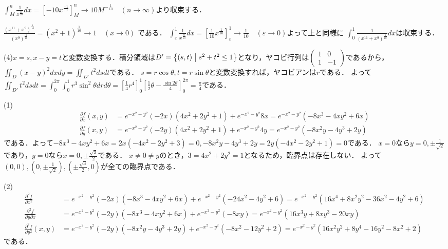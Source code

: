 \documentclass[
		book,
		head_space=20mm,
		foot_space=20mm,
		gutter=10mm,
		line_length=190mm
]{jlreq}
\begin{document}
$\int_M^n \frac{1}{x^{\frac{11}{10}}}dx=\left[ -10x^{\frac{-1}{10}} \right]_M^n\rightarrow 10 M^{-\frac{1}{10}}\quad(n\to \infty)$より収束する．

$\frac{(x^{11}+x^9)^{\frac{1}{10}}}{(x^{9})^{\frac{1}{10}}}=(x^2+1)^{\frac{1}{10}}\rightarrow 1\quad(x\to 0)$
である．
$\int_\varepsilon^1 \frac{1}{x^{\frac{9}{10}}}dx=\left[ \frac{1}{10}x^{\frac{1}{10}} \right]_\varepsilon^1\rightarrow \frac{1}{10}\quad(\varepsilon\rightarrow 0)$よって上と同様に
$\int_0^1 \frac{1}{(x^{11}+x^9)^{\frac{1}{10}}}dx$は収束する．

(4)$x=s,x-y=t$と変数変換する．積分領域は$D'=\left\{ (s,t)\mathrel{}\middle|\mathrel{} s^2+t^2\le 1\right\}$となり，ヤコビ行列は$\begin{pmatrix}
1&0\\1&-1
\end{pmatrix}$であるから，
$\iint_D (x-y)^2dxdy=\iint_{D'} t^2dsdt$である．
$s=r\cos \theta,t=r\sin \theta$と変数変換すれば，ヤコビアンは$r$である．
よって$\iint_{D'}t^2dsdt=\int_0^{2\pi}\int_0^1 r^3\sin^2 \theta dr d\theta=[\frac{1}{4}r^4]_0^1[\frac{1}{2}\theta-\frac{\sin 2\theta}{4}]_0^{2\pi}=\frac{\pi}{4}$である．

(1)\begin{align}
	\frac{\partial f}{\partial x}(x,y)&=e^{-x^2-y^2}(-2x)(4x^2+2y^2+1)+e^{-x^2-y^2}8x=e^{-x^2-y^2}(-8x^3-4xy^2+6x)\\
	\frac{\partial f}{\partial y}(x,y)&=e^{-x^2-y^2}(-2y)(4x^2+2y^2+1)+e^{-x^2-y^2}4y=e^{-x^2-y^2}(-8x^2y-4y^3+2y)
\end{align}
である．よって$-8x^3-4xy^2+6x=2x(-4x^2-2y^2+3)=0,-8x^2y-4y^3+2y=2y(-4x^2-2y^2+1)=0$である．
$x=0$なら$y=0,\pm\frac{1}{\sqrt{2}}$であり，$y=0$なら$x=0,\pm\frac{\sqrt{3}}{2}$である．
$x\neq0\neq y$のとき，$3=4x^2+2y^2=1$となるため，臨界点は存在しない．
よって$(0,0),(0,\pm\frac{1}{\sqrt{2}}),(\pm\frac{\sqrt{3}}{2},0)$が全ての臨界点である．

(2)\begin{align}
	\frac{\partial^2 f}{\partial x^2}&=e^{-x^2-y^2}(-2x)(-8x^3-4xy^2+6x)+e^{-x^2-y^2}(-24x^2-4y^2+6)=e^{-x^2-y^2}(16x^4+8x^2y^2-36x^2-4y^2+6)\\
	\frac{\partial^2 f}{\partial y\partial x}&=e^{-x^2-y^2}(-2y)(-8x^3-4xy^2+6x)+e^{-x^2-y^2}(-8xy)=e^{-x^2-y^2}(16x^3y+8xy^3-20xy)\\
	\frac{\partial^2 f}{\partial y^2}(x,y)&=e^{-x^2-y^2}(-2y)(-8x^2y-4y^3+2y)+e^{-x^2-y^2}(-8x^2-12y^2+2)=e^{-x^2-y^2}(16x^2y^2+8y^4-16y^2-8x^2+2)
\end{align}
である．
\end{document}
